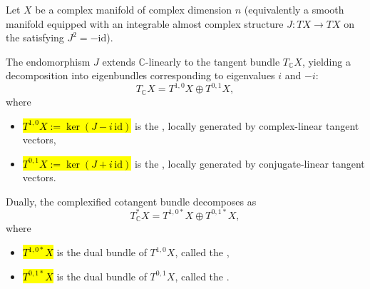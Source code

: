 \begin{definition} \label{definition:holomorphic_and_anti_holomorphic_tangent_bundles_of_a_complex_manifold} 
    Let $X$ be a complex manifold of complex dimension $n$ (equivalently a smooth manifold equipped with an integrable almost complex structure $J: TX \to TX$ on the  satisfying $J^2 = -\mathrm{id}$). 

    The endomorphism $J$ extends $\mathbb{C}$-linearly to the  tangent bundle $T_{\mathbb{C}} X$, yielding a decomposition into eigenbundles corresponding to eigenvalues $i$ and $-i$:
    $$T_{\mathbb{C}} X = T^{1,0} X \oplus T^{0,1} X,$$
    where
    \begin{itemize}
        \item \hl{$T^{1,0} X := \ker (J - i \,\mathrm{id})$} is the , locally generated by complex-linear tangent vectors,
        \item \hl{$T^{0,1} X := \ker (J + i \,\mathrm{id})$} is the , locally generated by conjugate-linear tangent vectors.
    \end{itemize}

    Dually, the complexified cotangent bundle decomposes as
    $$T_{\mathbb{C}}^* X = T^{1,0*} X \oplus T^{0,1*} X,$$
    where 
    \begin{itemize}
        \item \hl{$T^{1,0*} X$} is the dual bundle of $T^{1,0} X$, called the ,
        \item \hl{$T^{0,1*} X$} is the dual bundle of $T^{0,1} X$, called the .
    \end{itemize}
\end{definition}

